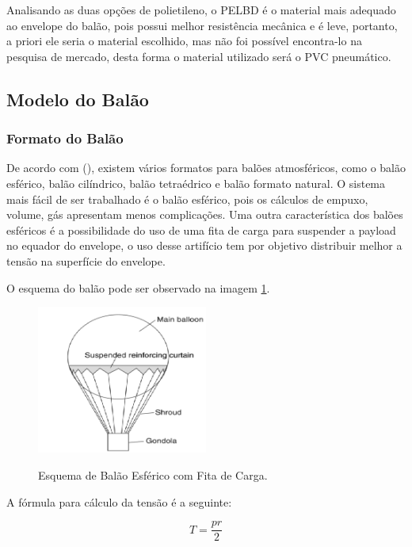 	Analisando as duas opções de polietileno, o PELBD é o material mais adequado ao envelope do balão, pois possui melhor resistência mecânica e é leve, portanto, a priori ele seria o material escolhido, mas não foi possível encontra-lo na pesquisa de mercado, desta forma o material utilizado será o PVC pneumático.


\subsection{Modelo do Balão} %
\label{sub:modelo_do_bal_o}

\subsubsection{Formato do Balão}
	De acordo com  (\citeyear{yajima}), existem vários formatos para balões atmosféricos, como o balão esférico, balão cilíndrico, balão tetraédrico e balão formato natural. O sistema mais fácil de ser trabalhado é o balão esférico, pois os cálculos de empuxo, volume, gás  apresentam menos complicações. Uma outra característica dos balões esféricos é a possibilidade do uso de uma fita de carga para suspender a payload no equador do envelope, o uso desse artifício tem por objetivo distribuir melhor a tensão na superfície do envelope.

	O esquema do balão pode ser observado na imagem \ref{img:balaoEsferico}.

	\begin{figure}[H]
		\centering
		\caption{Esquema de Balão Esférico com Fita de Carga.}
		\includegraphics[width=0.5\textwidth]{figuras/balaoEsferico}
		\label{img:balaoEsferico}
	\end{figure}

	A fórmula para cálculo da tensão é a seguinte:

	\begin{equacao}
	\caption{Tensão do balão}
		\begin{equation}
			T = \frac{pr}{2}
		\end{equation}
		\label{eqn:calculoTensao}
	\end{equacao}


